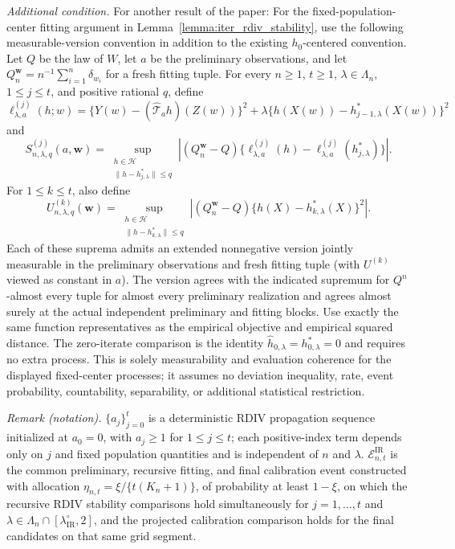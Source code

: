 \begin{lemma}
\end{lemma}

\emph{Additional condition.} For another result of the paper: For the fixed-population-center fitting argument in Lemma~\ref{lemma:iter_rdiv_stability}, use the following measurable-version convention in addition to the existing $h_0$-centered convention. Let $Q$ be the law of $W$, let $a$ be the preliminary observations, and let $Q_n^{\mathbf w}=n^{-1}\sum_{i=1}^n\delta_{w_i}$ for a fresh fitting tuple. For every $n\geqslant1$, $t\geqslant1$, $\lambda\in\Lambda_n$, $1\leqslant j\leqslant t$, and positive rational $q$, define \[ \ell^{(j)}_{\lambda,a}(h;w)=\{Y(w)-(\hat{\mathcal T}_a h)(Z(w))\}^2+\lambda\{h(X(w))-h_{j-1,\lambda}^*(X(w))\}^2 \] and \[ S^{(j)}_{n,\lambda,q}(a,\mathbf w)=\sup_{\substack{h\in\mathcal H\\\lVert h-h_{j,\lambda}^*\rVert\leqslant q}}\left|(Q_n^{\mathbf w}-Q)\{\ell^{(j)}_{\lambda,a}(h)-\ell^{(j)}_{\lambda,a}(h_{j,\lambda}^*)\}\right|. \] For $1\leqslant k\leqslant t$, also define \[ U^{(k)}_{n,\lambda,q}(\mathbf w)=\sup_{\substack{h\in\mathcal H\\\lVert h-h_{k,\lambda}^*\rVert\leqslant q}}\left|(Q_n^{\mathbf w}-Q)\{h(X)-h_{k,\lambda}^*(X)\}^2\right|. \] Each of these suprema admits an extended nonnegative version jointly measurable in the preliminary observations and fresh fitting tuple (with $U^{(k)}$ viewed as constant in $a$). The version agrees with the indicated supremum for $Q^n$-almost every tuple for almost every preliminary realization and agrees almost surely at the actual independent preliminary and fitting blocks. Use exactly the same function representatives as the empirical objective and empirical squared distance. The zero-iterate comparison is the identity $\hat h_{0,\lambda}=h_{0,\lambda}^*=0$ and requires no extra process. This is solely measurability and evaluation coherence for the displayed fixed-center processes; it assumes no deviation inequality, rate, event probability, countability, separability, or additional statistical restriction.

\noindent\textit{Remark (notation).} $\{a_j\}_{j=0}^t$ is a deterministic RDIV propagation sequence initialized at $a_0=0$, with $a_j\geqslant1$ for $1\leqslant j\leqslant t$; each positive-index term depends only on $j$ and fixed population quantities and is independent of $n$ and $\lambda$. $\mathcal E_{n,t}^{\mathrm{IR}}$ is the common preliminary, recursive fitting, and final calibration event constructed with allocation $\eta_{n,t}=\xi/\{t(K_n+1)\}$, of probability at least $1-\xi$, on which the recursive RDIV stability comparisons hold simultaneously for $j=1,\ldots,t$ and $\lambda\in\Lambda_n\cap[\lambda_{\mathrm{IR}}^\circ,2]$, and the projected calibration comparison holds for the final candidates on that same grid segment.

